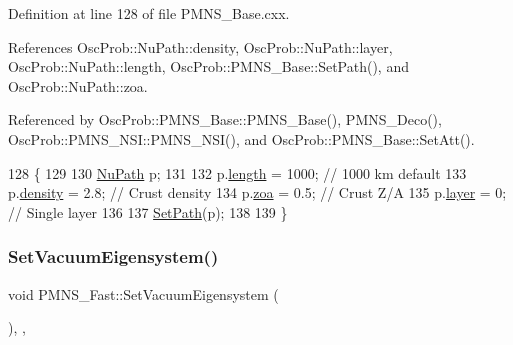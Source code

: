 Definition at line 128 of file P\+M\+N\+S\+\_\+\+Base.\+cxx.



References Osc\+Prob\+::\+Nu\+Path\+::density, Osc\+Prob\+::\+Nu\+Path\+::layer, Osc\+Prob\+::\+Nu\+Path\+::length, Osc\+Prob\+::\+P\+M\+N\+S\+\_\+\+Base\+::\+Set\+Path(), and Osc\+Prob\+::\+Nu\+Path\+::zoa.



Referenced by Osc\+Prob\+::\+P\+M\+N\+S\+\_\+\+Base\+::\+P\+M\+N\+S\+\_\+\+Base(), P\+M\+N\+S\+\_\+\+Deco(), Osc\+Prob\+::\+P\+M\+N\+S\+\_\+\+N\+S\+I\+::\+P\+M\+N\+S\+\_\+\+N\+S\+I(), and Osc\+Prob\+::\+P\+M\+N\+S\+\_\+\+Base\+::\+Set\+Att().


\begin{DoxyCode}
128                           \{
129 
130   \hyperlink{structOscProb_1_1NuPath}{NuPath} p;
131 
132   p.\hyperlink{structOscProb_1_1NuPath_af22660894b6e25cf835500381b155557}{length}  = 1000; \textcolor{comment}{// 1000 km default}
133   p.\hyperlink{structOscProb_1_1NuPath_a54ddd451db69bc54434de3cf18a117ca}{density} = 2.8;  \textcolor{comment}{// Crust density}
134   p.\hyperlink{structOscProb_1_1NuPath_af3213f3691ba83c6bc05f4a3490f6b31}{zoa}     = 0.5;  \textcolor{comment}{// Crust Z/A}
135   p.\hyperlink{structOscProb_1_1NuPath_a442b160899e554ad1d800989510d5309}{layer}   = 0;    \textcolor{comment}{// Single layer}
136 
137   \hyperlink{classOscProb_1_1PMNS__Base_ac3b644fd0a56347d304ceca4ae9d8875}{SetPath}(p);
138 
139 \}
\end{DoxyCode}
\mbox{\label{classOscProb_1_1PMNS__Fast_a76dd5a761df8689c502b28ad0391f9e2}} 
\subsubsection{\texorpdfstring{Set\+Vacuum\+Eigensystem()}{SetVacuumEigensystem()}}
{\footnotesize\ttfamily void P\+M\+N\+S\+\_\+\+Fast\+::\+Set\+Vacuum\+Eigensystem (\begin{DoxyParamCaption}{ }\end{DoxyParamCaption})\hspace{0.3cm}{\ttfamily [protected]}, {\ttfamily [virtual]}, {\ttfamily [inherited]}}

